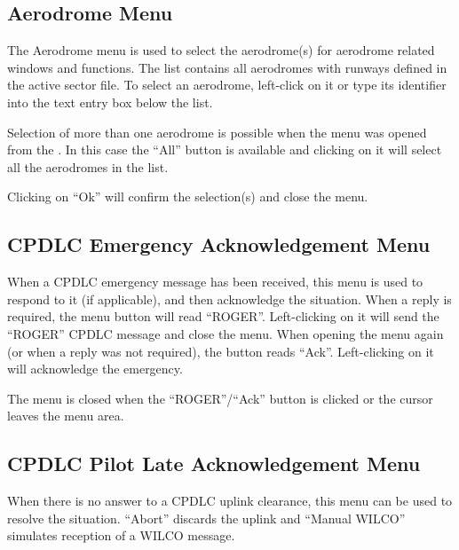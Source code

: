 \documentclass[a4paper,oneside,11pt]{memoir}
\begin{document}
\subsection{Aerodrome Menu}
\label{menu:ad}

The Aerodrome menu is used to select the aerodrome(s) for aerodrome related windows and functions. The list contains all aerodromes with runways defined in the active sector file. To select an aerodrome, left-click on it or type its identifier into the text entry box below the list.

\bigskip

Selection of more than one aerodrome is possible when the menu was opened from the . In this case the “All” button is available and clicking on it will select all the aerodromes in the list.

\bigskip

Clicking on “Ok” will confirm the selection(s) and close the menu.

\subsection{CPDLC Emergency Acknowledgement Menu}
\label{menu:dleam}

When a CPDLC emergency message has been received, this menu is used to respond to it (if applicable), and then acknowledge the situation. When a reply is required, the menu button will read “ROGER”. Left-clicking on it will send the “ROGER” CPDLC message and close the menu. When opening the menu again (or when a reply was not required), the button reads “Ack”. Left-clicking on it will acknowledge the emergency. 

\bigskip

The menu is closed when the “ROGER”/“Ack” button is clicked or the cursor leaves the menu area.

\subsection{CPDLC Pilot Late Acknowledgement Menu}
\label{menu:dlplam}

When there is no answer to a CPDLC uplink clearance, this menu can be used to resolve the situation. “Abort” discards the uplink and “Manual WILCO” simulates reception of a WILCO message.
\end{document}

